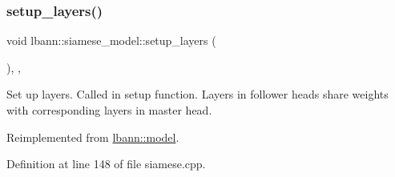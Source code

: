 \mbox{\label{classlbann_1_1siamese__model_afefdbaf473d40e571b2b58539001c9c0}} 
\subsubsection{\texorpdfstring{setup\+\_\+layers()}{setup\_layers()}}
{\footnotesize\ttfamily void lbann\+::siamese\+\_\+model\+::setup\+\_\+layers (\begin{DoxyParamCaption}{ }\end{DoxyParamCaption})\hspace{0.3cm}{\ttfamily [override]}, {\ttfamily [protected]}, {\ttfamily [virtual]}}

Set up layers. Called in setup function. Layers in follower heads share weights with corresponding layers in master head. 

Reimplemented from \hyperlink{classlbann_1_1model_a989ab581e359f65c9238d627cce5b589}{lbann\+::model}.



Definition at line 148 of file siamese.\+cpp.


